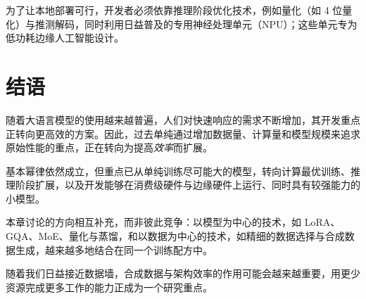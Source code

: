 为了让本地部署可行，开发者必须依靠推理阶段优化技术，例如量化（如 4 位量化）与推测解码，同时利用日益普及的专用神经处理单元（NPU）；这些单元专为低功耗边缘人工智能设计。

\section{结语}
随着大语言模型的使用越来越普遍，人们对快速响应的需求不断增加，其开发重点正转向更高效的方案。因此，过去单纯通过增加数据量、计算量和模型规模来追求原始性能的重点，正在转向为提高\emph{效率}而扩展。

基本幂律依然成立，但重点已从单纯训练尽可能大的模型，转向计算最优训练、推理阶段扩展，以及开发能够在消费级硬件与边缘硬件上运行、同时具有较强能力的小模型。

本章讨论的方向相互补充，而非彼此竞争：以模型为中心的技术，如 LoRA、GQA、MoE、量化与蒸馏，和以数据为中心的技术，如精细的数据选择与合成数据生成，越来越多地结合在同一个训练配方中。

随着我们日益接近数据墙，合成数据与架构效率的作用可能会越来越重要，用更少资源完成更多工作的能力正成为一个研究重点。




